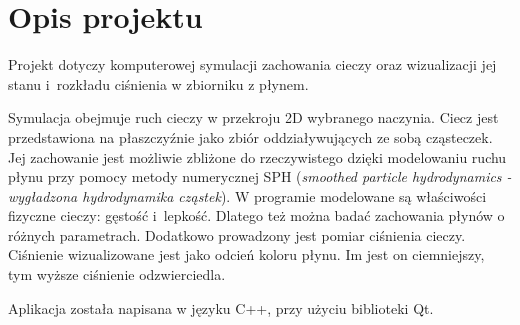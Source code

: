 
\section{Opis projektu}
Projekt dotyczy komputerowej symulacji zachowania cieczy oraz wizualizacji jej stanu i~rozkładu ciśnienia w zbiorniku z płynem.

Symulacja obejmuje ruch cieczy w przekroju 2D wybranego naczynia. Ciecz jest przedstawiona na płaszczyźnie jako zbiór oddziaływujących ze sobą cząsteczek.
Jej zachowanie jest możliwie zbliżone do rzeczywistego dzięki
modelowaniu ruchu płynu przy pomocy metody numerycznej SPH (\textit{smoothed particle hydrodynamics - wygładzona hydrodynamika cząstek}).
W programie modelowane są właściwości fizyczne cieczy: gęstość i~lepkość. Dlatego też można badać zachowania płynów o różnych parametrach. 
Dodatkowo prowadzony jest pomiar ciśnienia cieczy. Ciśnienie wizualizowane jest jako odcień koloru płynu.
Im jest on ciemniejszy, tym wyższe ciśnienie odzwierciedla.

Aplikacja została napisana w języku \textsf{C++}, przy użyciu biblioteki \textsf{Qt}.